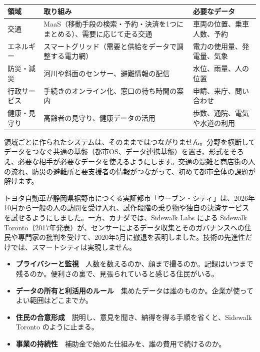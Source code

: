 \documentclass[paper=a4paper,fontsize=10pt,line_length=170mm,number_of_lines=46,baselineskip=1.6zw]{jlreq}
\newcommand\subhead[1]{\par\vspace{2.6mm}{\sffamily\bfseries\large #1}\par\vspace{1.3mm}}
\begin{document}
\begin{center}\small\renewcommand{\arraystretch}{1.15}\setlength{\tabcolsep}{1.5mm}
\begin{tabular}{|p{24.0mm}|p{68.0mm}|p{68.0mm}|}\arrayrulecolor{rulec}\hline
\rowcolor{papertwo}\sffamily\bfseries 領域 & \sffamily\bfseries 取り組み & \sffamily\bfseries 必要なデータ\\\hline
交通 & MaaS（移動手段の検索・予約・決済を1つにまとめる）、需要に応じて走る交通 & 車両の位置、乗車人数、予約\\\hline
エネルギー & スマートグリッド（需要と供給をデータで調整する電力網） & 電力の使用量、発電量、気象\\\hline
防災・減災 & 河川や斜面のセンサー、避難情報の配信 & 水位、雨量、人の位置\\\hline
行政サービス & 手続きのオンライン化、窓口の待ち時間の案内 & 申請、来庁、問い合わせ\\\hline
健康・見守り & 高齢者の見守り、健康データの活用 & 歩数、通院、電気や水道の利用\\\hline
\end{tabular}\end{center}\vspace{0.5mm}
\subhead{データ連携基盤}
領域ごとに作られたシステムは、そのままではつながりません。分野を横断してデータをつなぐ共通の基盤（都市OS、データ連携基盤）を置き、形式をそろえ、必要な相手が必要なデータを使えるようにします。交通の混雑と商店街の人の流れ、防災の避難所と要支援者の情報がつながって、初めて都市全体の課題が解けます。\par\vspace{1.2mm}
\subhead{国内外の取り組み}
トヨタ自動車が静岡県裾野市につくる実証都市「ウーブン・シティ」は、2026年10月から一般の人の訪問を受け入れ、試作段階の乗り物や独自の決済サービスを試せるようにしました。一方、カナダでは、Sidewalk Labs による Sidewalk Toronto（2017年発表）が、センサーによるデータ収集とそのガバナンスへの住民や専門家の批判を受けて、2020年5月に撤退を表明しました。技術の先進性だけでは、スマートシティは実現しません。\par\vspace{1.2mm}
\subhead{課題}
\begin{itemize}[leftmargin=1.5em,itemsep=0.6mm,topsep=0.3mm]
\item {\sffamily\bfseries プライバシーと監視}　人数を数えるのか、顔まで撮るのか。記録はいつまで残るのか。便利さの裏で、見張られていると感じる住民がいる。
\item {\sffamily\bfseries データの所有と利活用のルール}　集めたデータは誰のものか。企業が使ってよい範囲はどこまでか。
\item {\sffamily\bfseries 住民の合意形成}　説明し、意見を聞き、納得を得る手順を省くと、Sidewalk Toronto のように止まる。
\item {\sffamily\bfseries 事業の持続性}　補助金で始めた仕組みを、誰の費用で続けるのか。
\end{itemize}\vspace{0.8mm}
\end{document}
